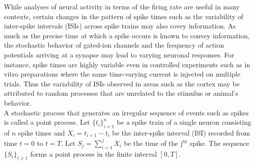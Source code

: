 
While analyses of neural activity in terms of the firing rate are useful in many contexts, certain changes in the pattern of spike times such as the variability of inter-spike intervals (ISIs) across spike trains may also covey information.
As much as the precise time at which a spike occurs is known to convey information, the stochastic behavior of gated-ion channels and the frequency of action potentials arriving at a synapse may lead to varying neuronal responses.
For instance, spike times are highly variable even in controlled experiments such as in vitro preparations where the same time-varying current is injected on multiple trials. Thus the variability of ISIs observed in areas such as the cortex may be attributed to random processes that are unrelated to the stimulus or animal's behavior.\\

A stochastic process that generates an irregular sequence of events such as spikes is called a point process. Let $\{t_{i} \}_{i=1}^{n}$ be a spike train of a single neuron consisting of
$n$ spike times and $X_{i} = t_{i+1} - t_{i}$ be the inter-spike interval (ISI) recorded from
time $t=0$ to $t=T$. Let $S_{j} = \sum_{i=1}^{j}X_{i}$ be the time of the j$^{th}$ spike.
The sequence $\{ S_{i} \}_{i \geq 1}$ forms a point process in the finite interval $[0, T]$.




